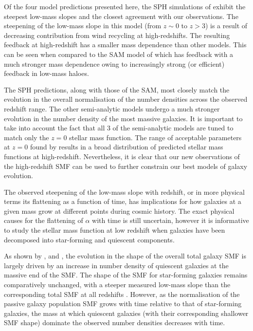 Of the four model predictions presented here, the SPH simulations of \citet{Dave:2013bf} exhibit the steepest low-mass slopes and the closest agreement with our observations. The steepening of the low-mass slope in this model (from $z \sim 0$ to $z > 3$) is a result of decreasing contribution from wind recycling at high-redshifts. The resulting feedback at high-redshift has a smaller mass dependence than other models. This can be seen when compared to the SAM model of \citet{Lu:2011hj} which has feedback with a much stronger mass dependence owing to increasingly strong (or efficient) feedback in low-mass haloes. 

The SPH predictions, along with those of the \citet{Lu:2011hj} SAM, most closely match the evolution in the overall normalisation of the number densities across the observed redshift range. The other semi-analytic models undergo a much stronger evolution in the number density of the most massive galaxies. It is important to take into account the fact that all 3 of the semi-analytic models are tuned to match only the $z = 0$ stellar mass function. The range of acceptable parameters at $z = 0$ found by \citet{Lu:2011hj} results in a broad distribution of predicted stellar mass functions at high-redshift. Nevertheless, it is clear that our new observations of the high-redshift SMF can be used to further constrain our best models of galaxy evolution.

The observed steepening of the low-mass slope with redshift, or in more physical terms its flattening as a function of time, has implications for how galaxies at a given mass grow at different points during cosmic history. The exact physical causes for the flattening of $\alpha$ with time is still uncertain, however it is informative to study the stellar mass function at low redshift when galaxies have been decomposed into star-forming and quiescent components. 

As shown by \citet{Muzzin:2013bl}, \citet{Ilbert:2013dq} and \citet{Mortlock:2014et}, the evolution in the shape of the overall total galaxy SMF is largely driven by an increase in number density of quiescent galaxies at the massive end of the SMF. The shape of the SMF for star-forming galaxies remains comparatively unchanged, with a steeper measured low-mass slope than the corresponding total SMF at all redshifts \citep{Mortlock:2014et}. However, as the normalisation of the passive galaxy population SMF grows with time relative to that of star-forming galaxies, the mass at which quiescent galaxies (with their corresponding shallower SMF shape) dominate the observed number densities decreases with time. 

